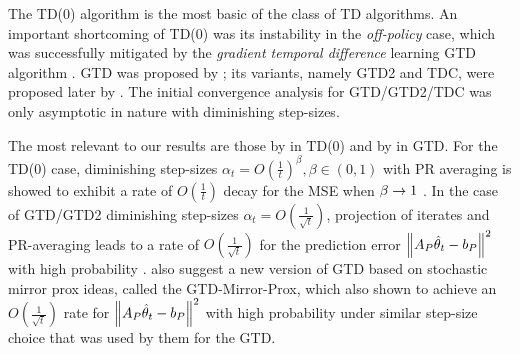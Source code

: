 The TD(0) algorithm is the most basic of the class of TD algorithms. 
An important shortcoming of TD(0) was its instability in the \emph{off-policy} case, which 
was successfully mitigated by the \emph{gradient temporal difference} learning GTD algorithm \cite{gtd2}. 
GTD was proposed by \citet{gtd}; its variants, namely GTD2 and TDC, were proposed later by \citet{gtd2}. 
The initial convergence analysis for GTD/GTD2/TDC was only asymptotic in nature \cite{gtd,gtd2} with diminishing step-sizes.

The most relevant to our results are those by \citet{korda-prashanth} in TD(0) and by \citet{gtdmp} in GTD. For the TD(0) case,  diminishing step-sizes $\alpha_t=O(\frac{1}{t})^\beta,\beta \in(0,1)$ with PR averaging is showed to exhibit a rate of $O(\frac{1}{t})$ decay for the MSE when $\beta\rightarrow 1$ \cite{korda-prashanth}. 
In the case of GTD/GTD2 diminishing step-sizes $\alpha_t=O(\frac{1}{\sqrt{t}})$, projection of iterates and PR-averaging leads to a rate of $O(\frac{1}{\sqrt{t}})$ 
for the prediction error $\left\| A_P\hat{\theta}_t-b_P\right\|^2$ with high probability \cite{gtdmp}. 
\citet{gtdmp} also suggest a new version of GTD based on stochastic mirror prox ideas, called the GTD-Mirror-Prox, 
which also shown to achieve an $O(\frac{1}{\sqrt{t}})$ rate for $\left\| A_P\hat{\theta}_t-b_P\right\|^2$ with high probability under similar step-size choice that was used by them for the GTD.

